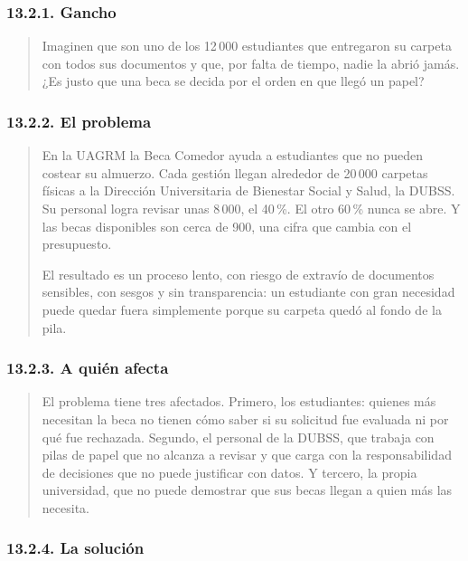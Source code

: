 \subsubsection{13.2.1. Gancho}

\begin{quote}
Imaginen que son uno de los 12\,000 estudiantes que entregaron su carpeta con todos sus documentos y que, por falta de tiempo, nadie la abrió jamás. ¿Es justo que una beca se decida por el orden en que llegó un papel?
\end{quote}

\subsubsection{13.2.2. El problema}

\begin{quote}
En la UAGRM la Beca Comedor ayuda a estudiantes que no pueden costear su almuerzo. Cada gestión llegan alrededor de 20\,000 carpetas físicas a la Dirección Universitaria de Bienestar Social y Salud, la DUBSS. Su personal logra revisar unas 8\,000, el 40\,\%. El otro 60\,\% nunca se abre. Y las becas disponibles son cerca de 900, una cifra que cambia con el presupuesto.

El resultado es un proceso lento, con riesgo de extravío de documentos sensibles, con sesgos y sin transparencia: un estudiante con gran necesidad puede quedar fuera simplemente porque su carpeta quedó al fondo de la pila.
\end{quote}

\subsubsection{13.2.3. A quién afecta}

\begin{quote}
El problema tiene tres afectados. Primero, los estudiantes: quienes más necesitan la beca no tienen cómo saber si su solicitud fue evaluada ni por qué fue rechazada. Segundo, el personal de la DUBSS, que trabaja con pilas de papel que no alcanza a revisar y que carga con la responsabilidad de decisiones que no puede justificar con datos. Y tercero, la propia universidad, que no puede demostrar que sus becas llegan a quien más las necesita.
\end{quote}

\subsubsection{13.2.4. La solución}

